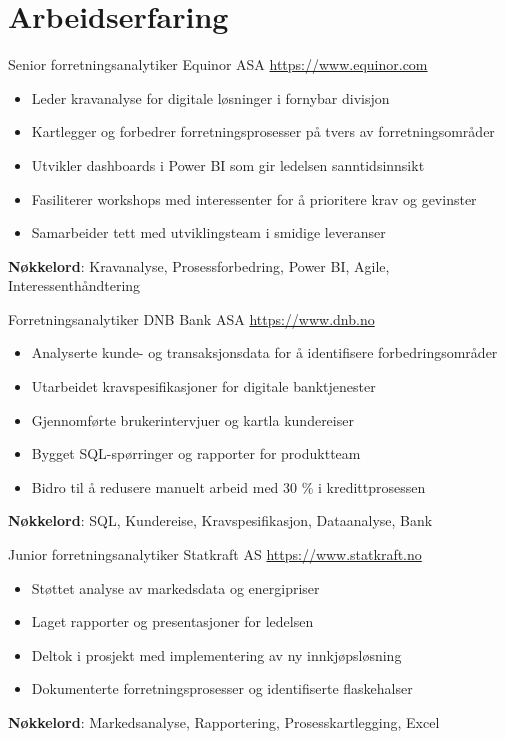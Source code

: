 \documentclass[a4paper, serif, 10pt]{moderncv}
\begin{document}
\section{Arbeidserfaring}

        {Senior forretningsanalytiker}
        {Equinor ASA}
        {\url{https://www.equinor.com}}
        {}
        {\begin{itemize}
\item Leder kravanalyse for digitale løsninger i fornybar divisjon
\item Kartlegger og forbedrer forretningsprosesser på tvers av forretningsområder
\item Utvikler dashboards i Power BI som gir ledelsen sanntidsinnsikt
\item Fasiliterer workshops med interessenter for å prioritere krav og gevinster
\item Samarbeider tett med utviklingsteam i smidige leveranser
\end{itemize}
\textbf{Nøkkelord}: Kravanalyse, Prosessforbedring, Power BI, Agile, Interessenthåndtering}

        {Forretningsanalytiker}
        {DNB Bank ASA}
        {\url{https://www.dnb.no}}
        {}
        {\begin{itemize}
\item Analyserte kunde- og transaksjonsdata for å identifisere forbedringsområder
\item Utarbeidet kravspesifikasjoner for digitale banktjenester
\item Gjennomførte brukerintervjuer og kartla kundereiser
\item Bygget SQL-spørringer og rapporter for produktteam
\item Bidro til å redusere manuelt arbeid med 30 \% i kredittprosessen
\end{itemize}
\textbf{Nøkkelord}: SQL, Kundereise, Kravspesifikasjon, Dataanalyse, Bank}

        {Junior forretningsanalytiker}
        {Statkraft AS}
        {\url{https://www.statkraft.no}}
        {}
        {\begin{itemize}
\item Støttet analyse av markedsdata og energipriser
\item Laget rapporter og presentasjoner for ledelsen
\item Deltok i prosjekt med implementering av ny innkjøpsløsning
\item Dokumenterte forretningsprosesser og identifiserte flaskehalser
\end{itemize}
\textbf{Nøkkelord}: Markedsanalyse, Rapportering, Prosesskartlegging, Excel}
\end{document}
